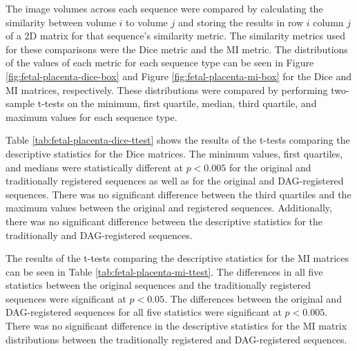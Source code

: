 The image volumes across each sequence were compared by calculating the similarity between volume $i$ to volume $j$ and storing the results in row $i$ column $j$ of a 2D matrix for that sequence's similarity metric. The similarity metrics used for these comparisons were the Dice metric and the MI metric. The distributions of the values of each metric for each sequence type can be seen in Figure \ref{fig:fetal-placenta-dice-box} and Figure \ref{fig:fetal-placenta-mi-box} for the Dice and MI matrices, respectively. These distributions were compared by performing two-sample t-tests on the minimum, first quartile, median, third quartile, and maximum values for each sequence type. 

Table \ref{tab:fetal-placenta-dice-ttest} shows the results of the t-tests comparing the descriptive statistics for the Dice matrices. The minimum values, first quartiles, and medians were statistically different at $p < 0.005$ for the original and traditionally registered sequences as well as for the original and DAG-registered sequences. There was no significant difference between the third quartiles and the maximum values between the original and registered sequences. Additionally, there was no significant difference between the descriptive statistics for the traditionally and DAG-registered sequences.

The results of the t-tests comparing the descriptive statistics for the MI matrices can be seen in Table \ref{tab:fetal-placenta-mi-ttest}. The differences in all five statistics between the original sequences and the traditionally registered sequences were significant at $p < 0.05$. The differences between the original and DAG-registered sequences for all five statistics were significant at $p < 0.005$. There was no significant difference in the descriptive statistics for the MI matrix distributions between the traditionally registered and DAG-registered sequences.

